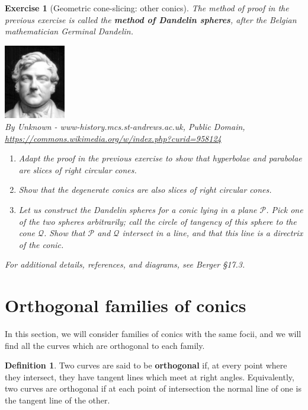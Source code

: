 \documentclass[a4paper,leqno,10pt]{article}
\theoremstyle{exercise}
\newtheorem{Exercise}{Exercise}
\newenvironment{exercise}
  {\begin{mdframed}\begin{Exercise}}
  {\end{Exercise}\end{mdframed}}
\theoremstyle{plain}
\theoremstyle{definition}
\newtheorem*{defn}{Definition}
\theoremstyle{remark}
\newcommand{\df}{\textbf}
\begin{document}
\begin{exercise}[Geometric cone-slicing: other conics]
  The method of proof in the previous exercise is called the \df{method of Dandelin spheres}, after the Belgian mathematician Germinal Dandelin.
  \begin{center}
    \includegraphics[width=0.2\textwidth]{dandelin}\\
    \small{By Unknown - www-history.mcs.st-andrews.ac.uk, Public Domain, \url{https://commons.wikimedia.org/w/index.php?curid=958124}}
  \end{center}

  \begin{enumerate}
    \item Adapt the proof in the previous exercise to show that hyperbolae and parabolae are slices of right circular cones.
    \item Show that the degenerate conics are also slices of right circular cones.
    \item Let us construct the Dandelin spheres for a conic lying in a plane $ \mathcal{P} $. Pick one of the two spheres arbitrarily; call the circle
          of tangency of this sphere to the cone $ \mathcal{Q} $. Show that $ \mathcal{P} $ and $ \mathcal{Q} $ intersect in a line, and that this
          line is a directrix of the conic.
  \end{enumerate}

  For additional details, references, and diagrams, see Berger \S17.3.
\end{exercise}

\section{Orthogonal families of conics}
In this section, we will consider families of conics with the same focii, and we will find all the curves which are orthogonal
to each family.

\begin{defn}
  Two curves are said to be \df{orthogonal} if, at every point where they intersect, they have tangent lines
  which meet at right angles. Equivalently, two curves are orthogonal if at each point of intersection the normal
  line of one is the tangent line of the other.
\end{defn}
\end{document}
